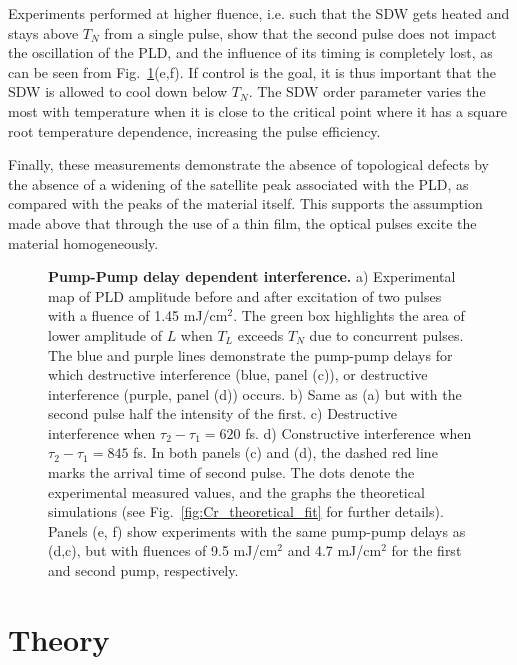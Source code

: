 Experiments performed at higher fluence, i.e. such that the SDW gets heated and stays above $T_N$ from a single pulse, show that the second pulse does not impact the oscillation of the PLD, and the influence of its timing is completely lost, as can be seen from Fig.~\ref{fig:Cr_experimental}(e,f).
If control is the goal, it is thus important that the SDW is allowed to cool down below $T_N$.
The SDW order parameter varies the most with temperature when it is close to the critical point where it has a square root temperature dependence, increasing the pulse efficiency.

Finally, these measurements demonstrate the absence of topological defects by the absence of a widening of the satellite peak associated with the PLD, as compared with the peaks of the material itself.
This supports the assumption made above that through the use of a thin film, the optical pulses excite the material homogeneously. 
\begin{figure}
\caption{\label{fig:Cr_experimental}{\bf Pump-Pump delay dependent interference.} a) Experimental map of PLD amplitude before and after excitation of two pulses with a fluence of 1.45 mJ/cm$^2$. The green box highlights the area of lower amplitude of $L$ when $T_L$ exceeds $T_N$ due to concurrent pulses. The blue and purple lines demonstrate the pump-pump delays for which destructive interference (blue, panel (c)), or destructive interference (purple, panel (d)) occurs. b) Same as (a) but with the second pulse half the intensity of the first.  c) Destructive interference when $\tau_2 - \tau_1 = 620$ fs. d) Constructive interference when $\tau_2 - \tau_1 = 845$ fs. In both panels (c) and (d), the dashed red line marks the arrival time of second pulse. The dots denote the experimental measured values, and the graphs the theoretical simulations (see Fig.~\ref{fig:Cr_theoretical_fit} for further details). Panels (e, f) show experiments with the same pump-pump delays as (d,c), but with fluences of 9.5 mJ/cm$^2$ and 4.7 mJ/cm$^2$ for the first and second pump, respectively.}
\end{figure}

\section{Theory}

